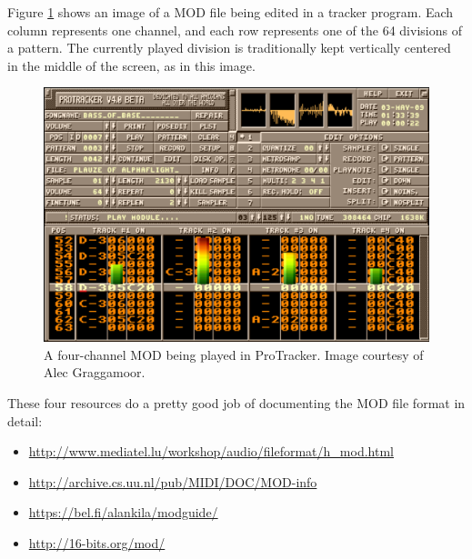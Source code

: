 Figure \ref{img-protracker} shows an image of a MOD file being edited in a tracker program.
Each column represents one channel, and each row represents one of the 64 divisions of a pattern.
The currently played division is traditionally kept vertically centered in the middle of the screen, as in this image.


\begin{figure}[H]
	\includegraphics[width = \textwidth]{images/Protracker.png}
	\caption{A four-channel MOD being played in ProTracker. Image courtesy of Alec Graggamoor.}
	\label{img-protracker}
\end{figure}

These four resources do a pretty good job of documenting the MOD file format in detail:
\begin{itemize}
	\item{\url{http://www.mediatel.lu/workshop/audio/fileformat/h_mod.html}}
	\item{\url{http://archive.cs.uu.nl/pub/MIDI/DOC/MOD-info}}
	\item{\url{https://bel.fi/alankila/modguide/}}
	\item{\url{http://16-bits.org/mod/}}
\end{itemize}

\newpage


